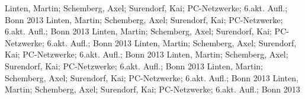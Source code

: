 
 Linten, Martin; Schemberg, Axel; Surendorf, Kai; PC-Netzwerke; 6.akt. Aufl.; Bonn 2013
 Linten, Martin; Schemberg, Axel; Surendorf, Kai; PC-Netzwerke; 6.akt. Aufl.; Bonn 2013
 Linten, Martin; Schemberg, Axel; Surendorf, Kai; PC-Netzwerke; 6.akt. Aufl.; Bonn 2013
 Linten, Martin; Schemberg, Axel; Surendorf, Kai; PC-Netzwerke; 6.akt. Aufl.; Bonn 2013
 Linten, Martin; Schemberg, Axel; Surendorf, Kai; PC-Netzwerke; 6.akt. Aufl.; Bonn 2013
 Linten, Martin; Schemberg, Axel; Surendorf, Kai; PC-Netzwerke; 6.akt. Aufl.; Bonn 2013
 Linten, Martin; Schemberg, Axel; Surendorf, Kai; PC-Netzwerke; 6.akt. Aufl.; Bonn 2013